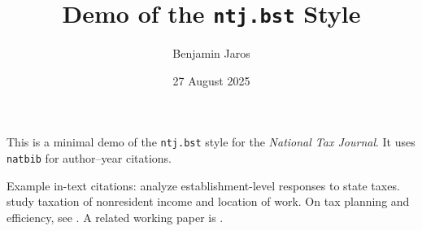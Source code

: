 \documentclass[12pt]{article}
\title{Demo of the \texttt{ntj.bst} Style}
\author{Benjamin Jaros}
\date{27 August 2025}
\begin{document}
\maketitle

This is a minimal demo of the \texttt{ntj.bst} style for the
\emph{National Tax Journal}. It uses \texttt{natbib} for author--year citations.

Example in-text citations:
\citet{giroud_state_2019} analyze establishment-level responses to state taxes.
\citet{agrawal_state_2024} study taxation of nonresident income and location of work.
On tax planning and efficiency, see \citet{auerbach_extent_2007}.
A related working paper is \citep{jaros_ssf_2025}.



\end{document}
